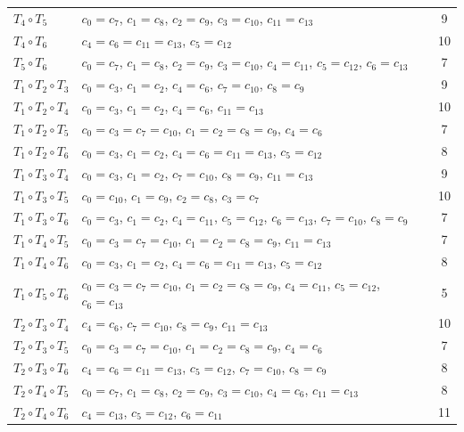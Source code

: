 \documentclass{article}
\begin{document}
{\begin{longtable}{l l c}
$T_4 \circ T_5$ & $c_0 = c_7$, $c_1 = c_8$, $c_2 = c_9$, $c_3 = c_{10}$, $c_{11} = c_{13}$ & 9 \\
$T_4 \circ T_6$ & $c_4 = c_6 = c_{11} = c_{13}$, $c_5 = c_{12}$ & 10 \\
$T_5 \circ T_6$ & $c_0 = c_7$, $c_1 = c_8$, $c_2 = c_9$, $c_3 = c_{10}$, $c_4 = c_{11}$, $c_5 = c_{12}$, $c_6 = c_{13}$ & 7 \\
$T_1 \circ T_2 \circ T_3$ & $c_0 = c_3$, $c_1 = c_2$, $c_4 = c_6$, $c_7 = c_{10}$, $c_8 = c_9$ & 9 \\
$T_1 \circ T_2 \circ T_4$ & $c_0 = c_3$, $c_1 = c_2$, $c_4 = c_6$, $c_{11} = c_{13}$ & 10 \\
$T_1 \circ T_2 \circ T_5$ & $c_0 = c_3 = c_7 = c_{10}$, $c_1 = c_2 = c_8 = c_9$, $c_4 = c_6$ & 7 \\
$T_1 \circ T_2 \circ T_6$ & $c_0 = c_3$, $c_1 = c_2$, $c_4 = c_6 = c_{11} = c_{13}$, $c_5 = c_{12}$ & 8 \\
$T_1 \circ T_3 \circ T_4$ & $c_0 = c_3$, $c_1 = c_2$, $c_7 = c_{10}$, $c_8 = c_9$, $c_{11} = c_{13}$ & 9 \\
$T_1 \circ T_3 \circ T_5$ & $c_0 = c_{10}$, $c_1 = c_9$, $c_2 = c_8$, $c_3 = c_7$ & 10 \\
$T_1 \circ T_3 \circ T_6$ & $c_0 = c_3$, $c_1 = c_2$, $c_4 = c_{11}$, $c_5 = c_{12}$, $c_6 = c_{13}$, $c_7 = c_{10}$, $c_8 = c_9$ & 7 \\
$T_1 \circ T_4 \circ T_5$ & $c_0 = c_3 = c_7 = c_{10}$, $c_1 = c_2 = c_8 = c_9$, $c_{11} = c_{13}$ & 7 \\
$T_1 \circ T_4 \circ T_6$ & $c_0 = c_3$, $c_1 = c_2$, $c_4 = c_6 = c_{11} = c_{13}$, $c_5 = c_{12}$ & 8 \\
$T_1 \circ T_5 \circ T_6$ & $c_0 = c_3 = c_7 = c_{10}$, $c_1 = c_2 = c_8 = c_9$, $c_4 = c_{11}$, $c_5 = c_{12}$, $c_6 = c_{13}$ & 5 \\
$T_2 \circ T_3 \circ T_4$ & $c_4 = c_6$, $c_7 = c_{10}$, $c_8 = c_9$, $c_{11} = c_{13}$ & 10 \\
$T_2 \circ T_3 \circ T_5$ & $c_0 = c_3 = c_7 = c_{10}$, $c_1 = c_2 = c_8 = c_9$, $c_4 = c_6$ & 7 \\
$T_2 \circ T_3 \circ T_6$ & $c_4 = c_6 = c_{11} = c_{13}$, $c_5 = c_{12}$, $c_7 = c_{10}$, $c_8 = c_9$ & 8 \\
$T_2 \circ T_4 \circ T_5$ & $c_0 = c_7$, $c_1 = c_8$, $c_2 = c_9$, $c_3 = c_{10}$, $c_4 = c_6$, $c_{11} = c_{13}$ & 8 \\
$T_2 \circ T_4 \circ T_6$ & $c_4 = c_{13}$, $c_5 = c_{12}$, $c_6 = c_{11}$ & 11 \\

\end{longtable}}
\end{document}
